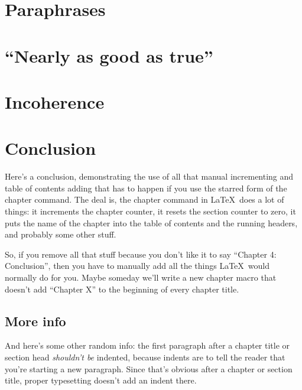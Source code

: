 \documentclass[12pt,twoside]{reedfancy}
\begin{document}
\begin{spacing}{1.25}

\chapter{Paraphrases}

	
\chapter{``Nearly as good as true''}


\chapter{Incoherence}


\chapter{Conclusion}
\label{concl}
	
Here's a conclusion, demonstrating the use of all that manual
incrementing and table of contents adding that has to happen if you
use the starred form of the chapter command.  The deal is, the chapter
command in \LaTeX\ does a lot of things: it increments the chapter
counter, it resets the section counter to zero, it puts the name of
the chapter into the table of contents and the running headers, and
probably some other stuff.

So, if you remove all that stuff because you don't like it to say
``Chapter 4: Conclusion'', then you have to manually add all the
things \LaTeX\ would normally do for you.  Maybe someday we'll write a
new chapter macro that doesn't add ``Chapter X'' to the beginning of
every chapter title.

\section{More info}
And here's some other random info: the first paragraph after a chapter
title or section head \emph{shouldn't be} indented, because indents
are to tell the reader that you're starting a new paragraph.  Since
that's obvious after a chapter or section title, proper typesetting
doesn't add an indent there.



\end{spacing}
\end{document}
